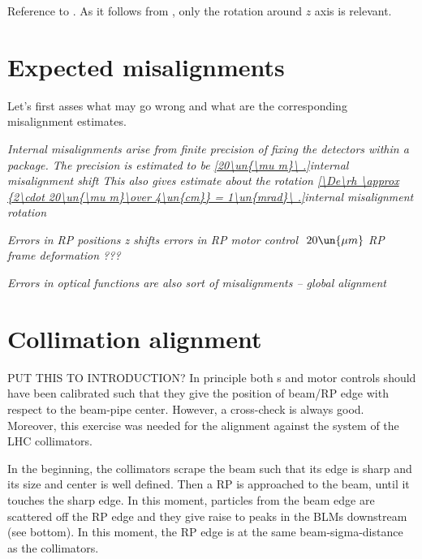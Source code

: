 Reference to .
As it follows from , only the rotation around $z$ axis is relevant.

\section[al exp misal]{Expected misalignments}

Let's first asses what may go wrong and what are the corresponding misalignment estimates.

\noindent\em{Internal misalignments} arise from finite precision of fixing the detectors within a package. The precision is estimated to be
\eqref{20\un{\mu m}\ .}{internal misalignment shift}
This also gives estimate about the rotation
\eqref{\De\rh \approx {2\cdot 20\un{\mu m}\over 4\un{cm}} = 1\un{mrad}\ .}{internal misalignment rotation}

\noindent\em{Errors in RP positions}
\> z shifts
\> errors in RP motor control $~20\un{\mu m}$
\> RP frame deformation ???

\noindent\em{Errors in optical functions} are also sort of misalignments -- global alignment


\section[al collim]{Collimation alignment}

PUT THIS TO INTRODUCTION? In principle both s and  motor controls should have been calibrated such that they give the position of beam/RP edge with respect to the beam-pipe center. However, a cross-check is always good. Moreover, this exercise was needed for the alignment against the system of the LHC collimators.

In the beginning, the collimators scrape the beam such that its edge is sharp and its size and center is well defined. Then a RP is approached to the beam, until it touches the sharp edge. In this moment, particles from the beam edge are scattered off the RP edge and they give raise to peaks in the BLMs downstream (see  bottom). In this moment, the RP edge is at the same beam-sigma-distance as the collimators.

